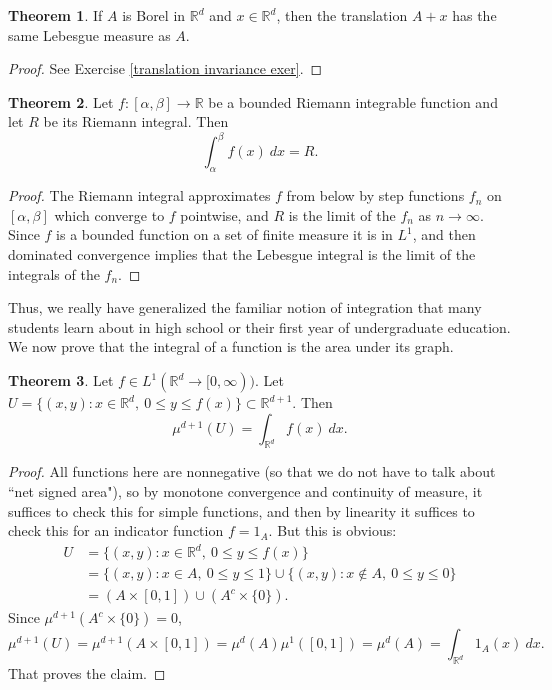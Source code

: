 \documentclass[12pt]{book}
\newcommand{\RR}{\mathbb{R}}
\theoremstyle{definition}
\newtheorem{theorem}{Theorem}[section]
\begin{document}
\begin{theorem}
\label{translation invariance in Rd}
If $A$ is Borel in $\RR^d$ and $x \in \RR^d$, then the translation $A + x$ has the same Lebesgue measure as $A$.
\end{theorem}
\begin{proof}
See Exercise \ref{translation invariance exer}.
\end{proof}

\begin{theorem}
Let $f: [\alpha, \beta] \to \RR$ be a bounded Riemann integrable function and let $R$ be its Riemann integral. Then
$$\int_\alpha^\beta f(x)~dx = R.$$
\end{theorem}
\begin{proof}
The Riemann integral approximates $f$ from below by step functions $f_n$ on $[\alpha, \beta]$ which converge to $f$ pointwise, and $R$ is the limit of the $f_n$ as $n \to \infty$.
Since $f$ is a bounded function on a set of finite measure it is in $L^1$, and then dominated convergence implies that the Lebesgue integral is the limit of the integrals of the $f_n$.
\end{proof}

Thus, we really have generalized the familiar notion of integration that many students learn about in high school or their first year of undergraduate education.
We now prove that the integral of a function is the area under its graph.

\begin{theorem}
Let $f \in L^1(\RR^d \to [0, \infty))$.
Let $U = \{(x, y): x \in \RR^d, ~0 \leq y \leq f(x)\} \subset \RR^{d+1}$.
Then
$$\mu^{d+1}(U) = \int_{\RR^d} f(x)~dx.$$
\end{theorem}
\begin{proof}
All functions here are nonnegative (so that we do not have to talk about ``net signed area"), so by monotone convergence and continuity of measure, it suffices to check this for simple functions, and then by linearity it suffices to check this for an indicator function $f = 1_A$.
But this is obvious:
\begin{align*}U &= \{(x, y): x \in \RR^d, ~0 \leq y \leq f(x)\} \\&= \{(x, y): x \in A, ~0 \leq y \leq 1\} \cup \{(x, y): x \notin A, ~0 \leq y \leq 0\} \\&= (A \times [0, 1]) \cup (A^c \times \{0\}).\end{align*}
Since $\mu^{d+1}(A^c \times \{0\}) = 0$,
$$\mu^{d+1}(U) = \mu^{d+1}(A \times [0, 1]) = \mu^d(A) \mu^1([0, 1]) = \mu^d(A) = \int_{\RR^d} 1_A(x)~dx.$$
That proves the claim.
\end{proof}
\end{document}
